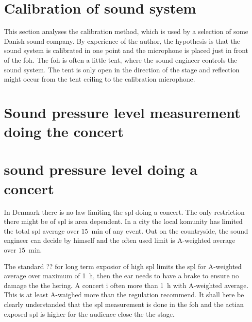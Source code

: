 \section{Calibration of sound system}
This section analyses the calibration method, which is used by a selection of some Danish sound company. By experience of the author, the hypothesis is that the sound system is calibrated in one point and the microphone is placed just in front of the \gls{foh}. The \gls{foh} is often a little tent, where the sound engineer controls the sound system. The tent is only open in the direction of the stage and reflection might occur from the tent ceiling to the calibration microphone. 

\section{Sound pressure level measurement doing the concert}

\section{sound pressure level doing a concert}
In Denmark there is no law limiting the \gls{spl} doing a concert. The only restriction there might be of \gls{spl} is area dependent. In a city the local komunity has limited the total \gls{spl} average over \SI{15}{\minute} of any event. Out on the countryside, the sound engineer can decide by himself and the often used limit is A-weighted  average over \SI{15}{\minute}. 


The standard ?? for long term exposior of high \gls{spl} limits the \gls{spl} for A-weighted  average over maximum of \SI{1}{\hour}, then the ear needs to have a brake to ensure no damage the the hering. A concert i often more than \SI{1}{\hour} with A-weighted  average. This is at least  A-waighed more than the regulation recommend. It shall here be clearly understanded that the \gls{spl} measurement is done in the \gls{foh} and the actian exposed \gls{spl} is higher for the audience close the the stage.   




